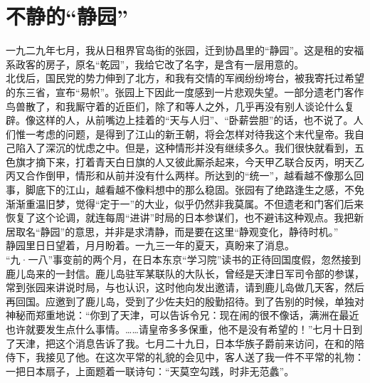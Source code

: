 \fancyhead[RO]{} %
\fancyhead[LE]{} %
\chapter*{不静的“静园”}
\thispagestyle{empty}
一九二九年七月，我从日租界官岛街的张园，迁到协昌里的“静园”。这是租的安福系政客的房子，原名“乾园”，我给它改了名字，是含有一层用意的。\\

北伐后，国民党的势力伸到了北方，和我有交情的军阀纷纷垮台，被我寄托过希望的东三省，宣布“易帜”。张园上下因此一度感到一片悲观失望。一部分遗老门客作鸟兽散了，和我厮守着的近臣们，除了和等人之外，几乎再没有别人谈论什么复辟。像这样的人，从前嘴边上挂着的“天与人归”、“卧薪尝胆”的话，也不说了。人们惟一考虑的问题，是得到了江山的新王朝，将会怎样对待我这个末代皇帝。我自己陷入了深沉的忧虑之中。但是，这种情形并没有继续多久。我们很快就看到，五色旗才摘下来，打着青天白日旗的人又彼此厮杀起来，今天甲乙联合反丙，明天乙丙又合作倒甲，情形和从前并没有什么两样。所达到的“统一”，越看越不像那么回事，脚底下的江山，越看越不像料想中的那么稳固。张园有了绝路逢生之感，不免渐渐重温旧梦，觉得“定于一”的大业，似乎仍然非我莫属。不但遗老和门客们后来恢复了这个论调，就连每周“进讲”时局的日本参谋们，也不避讳这种观点。我把新居取名“静园”的意思，并非是求清静，而是要在这里“静观变化，静待时机。”\\

静园里日日望着，月月盼着。一九三一年的夏天，真盼来了消息。\\

“九·一八”事变前的两个月，在日本东京“学习院”读书的正待回国度假，忽然接到鹿儿岛来的一封信。鹿儿岛驻军某联队的大队长，曾经是天津日军司令部的参谋，常到张园来讲说时局，与也认识，这时他向发出邀请，请到鹿儿岛做几天客，然后再回国。应邀到了鹿儿岛，受到了少佐夫妇的殷勤招待。到了告别的时候，单独对神秘而郑重地说：“你到了天津，可以告诉令兄：现在闹的很不像话，满洲在最近也许就要发生点什么事情。……请皇帝多多保重，他不是没有希望的！”七月十日到了天津，把这个消息告诉了我。七月二十九日，日本华族子爵前来访问，在和的陪侍下，我接见了他。在这次平常的礼貌的会见中，客人送了我一件不平常的礼物：一把日本扇子，上面题着一联诗句：“天莫空勾践，时非无范蠡”。\\

